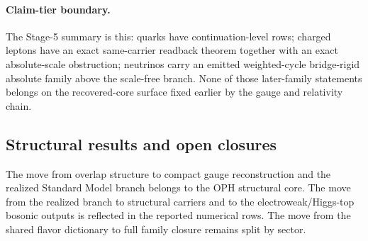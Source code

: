 \documentclass[11pt]{article}
\begin{document}
\paragraph{Claim-tier boundary.}
The Stage-5 summary is this: quarks have continuation-level rows; charged leptons have an exact same-carrier readback theorem together with an exact absolute-scale obstruction; neutrinos carry an emitted weighted-cycle bridge-rigid absolute family above the scale-free branch. None of those later-family statements belongs on the recovered-core surface fixed earlier by the gauge and relativity chain.
\subsection{Structural results and open closures}\label{step5-structural-results-and-open-closures}

The move from overlap structure to compact gauge reconstruction and the realized Standard Model branch belongs to the OPH structural core. The move from the realized branch to structural carriers and to the electroweak/Higgs-top bosonic outputs is reflected in the reported numerical rows. The move from the shared flavor dictionary to full family closure remains split by sector.
\end{document}
